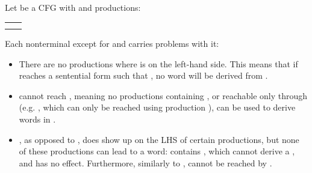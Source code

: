 \begin{isabellebody}
\begin{isamarkuptext}
\begin{example}\label{ex:useless symbols}
Let  be a CFG with  and productions:
\begin{center}
\begin{tabular}{cc}
\isa{S\ {\isasymrightarrow}\ A\ {\isacharbar}{\kern0pt}\ AB} & \isa{A\ {\isasymrightarrow}\ aA\ {\isacharbar}{\kern0pt}\ a}\\
\isa{C\ {\isasymrightarrow}\ ac\ {\isacharbar}{\kern0pt}\ BCD} & \isa{D\ {\isasymrightarrow}\ BC\ {\isacharbar}{\kern0pt}\ D}
\end{tabular}
\end{center}
Each nonterminal except for  and  carries problems with it:
\begin{itemize}
\item There are no productions where  is on the left-hand side. This means that if  
reaches a sentential form \isa{{\isasymalpha}} such that , no word will be derived from \isa{{\isasymalpha}}. 
\item {} cannot reach , meaning no productions containing , or reachable only 
through  (e.g. , which can only be reached using production \mbox{}), can be used to
derive words in .
\item {}, as opposed to , does show up on the LHS of certain productions, but none of these productions
can lead to a word:  contains , which cannot derive a , and  has no effect.
Furthermore, similarly to ,  cannot be reached by .
\end{itemize}
\end{example}


\end{isamarkuptext}
\end{isabellebody}
